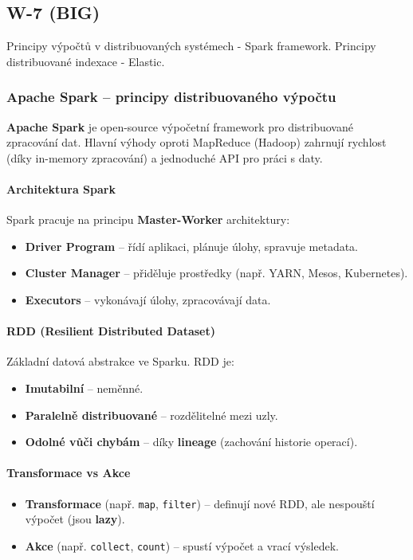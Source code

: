 \subsection{W-7 (BIG)}
Principy výpočtů v distribuovaných systémech - Spark framework. Principy distribuované indexace - Elastic.

\subsubsection*{Apache Spark – principy distribuovaného výpočtu}

\textbf{Apache Spark} je open-source výpočetní framework pro distribuované zpracování dat. Hlavní výhody oproti MapReduce (Hadoop) zahrnují rychlost (díky in-memory zpracování) a jednoduché API pro práci s daty.

\paragraph{Architektura Spark}
Spark pracuje na principu \textbf{Master-Worker} architektury:
\begin{itemize}
    \item \textbf{Driver Program} – řídí aplikaci, plánuje úlohy, spravuje metadata.
    \item \textbf{Cluster Manager} – přiděluje prostředky (např. YARN, Mesos, Kubernetes).
    \item \textbf{Executors} – vykonávají úlohy, zpracovávají data.
\end{itemize}

\paragraph{RDD (Resilient Distributed Dataset)}
Základní datová abstrakce ve Sparku. RDD je:
\begin{itemize}
    \item \textbf{Imutabilní} – neměnné.
    \item \textbf{Paralelně distribuované} – rozdělitelné mezi uzly.
    \item \textbf{Odolné vůči chybám} – díky \textbf{lineage} (zachování historie operací).
\end{itemize}

\paragraph{Transformace vs Akce}
\begin{itemize}
    \item \textbf{Transformace} (např. \texttt{map}, \texttt{filter}) – definují nové RDD, ale nespouští výpočet (jsou \textbf{lazy}).
    \item \textbf{Akce} (např. \texttt{collect}, \texttt{count}) – spustí výpočet a vrací výsledek.
\end{itemize}

